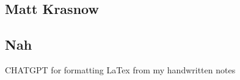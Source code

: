 \documentclass[submit]{../harvardml}
\begin{document}
\newpage
\subsection*{Matt Krasnow}

\subsection*{Nah}
CHATGPT for formatting LaTex from my handwritten notes
\end{document}
